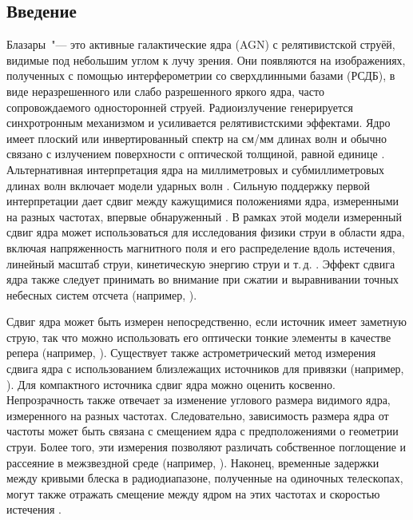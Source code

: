 \subsection{Введение}

Блазары~"--- это активные галактические ядра (AGN) с релятивистской струёй, видимые под небольшим
углом к ​​лучу зрения. Они появляются на изображениях, полученных с помощью интерферометрии со
сверхдлинными базами (РСДБ), в виде неразрешенного или слабо разрешенного яркого ядра, часто
сопровождаемого односторонней струей. Радиоизлучение генерируется синхротронным механизмом и
усиливается релятивистскими эффектами. Ядро имеет плоский или инвертированный спектр на см/мм длинах
волн и обычно связано с излучением поверхности с оптической толщиной, равной единице
\cite{Blandford_Konigl_1979}. Альтернативная интерпретация ядра на миллиметровых и субмиллиметровых
длинах волн включает модели ударных волн \cite{Marscher_2006,Marscher_2008}. Сильную поддержку
первой интерпретации дает сдвиг между кажущимися положениями ядра, измеренными на разных частотах,
впервые обнаруженный \cite{MS1984}. В рамках этой модели измеренный сдвиг ядра может использоваться
для исследования физики струи в области ядра, включая напряженность магнитного поля и его
распределение вдоль истечения, линейный масштаб струи, кинетическую энергию струи и т.\,д.
\cite{Lobanov_1998,Hirotani_2005}. Эффект сдвига ядра также следует принимать во внимание при сжатии
и выравнивании точных небесных систем отсчета (например,
\cite{Kovalev_2017,Petrov_2017a,Petrov_2017b}).

Сдвиг ядра может быть измерен непосредственно, если источник имеет заметную струю, так что можно
использовать его оптически тонкие элементы в качестве репера (например, \cite{Kovalev_2008}).
Существует также астрометрический метод измерения сдвига ядра с использованием близлежащих
источников для привязки (например, \cite{Hada_2001}). Для компактного источника сдвиг ядра можно
оценить косвенно. Непрозрачность также отвечает за изменение углового размера видимого ядра,
измеренного на разных частотах. Следовательно, зависимость размера ядра от частоты может быть
связана с смещением ядра с предположениями о геометрии струи. Более того, эти измерения позволяют
различать собственное поглощение и рассеяние в межзвездной среде (например,
\cite{Pushkarev_Kovalev_2015}). Наконец, временные задержки между кривыми блеска в радиодиапазоне,
полученные на одиночных телескопах, могут также отражать смещение между ядром на этих частотах
и скоростью истечения \cite{Kudryavtseva_2011,Kutkin_2014}.

